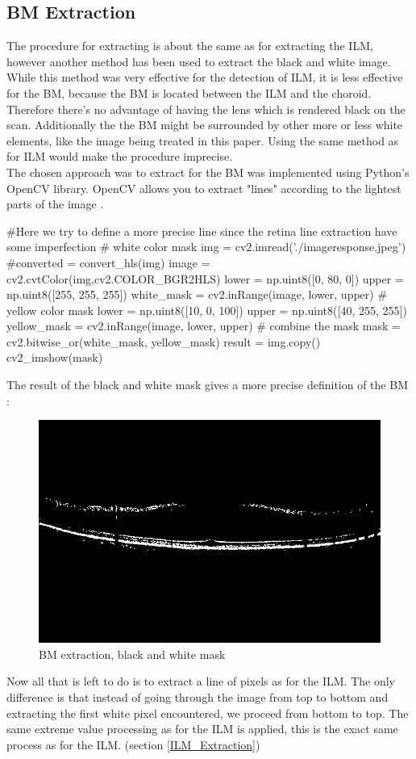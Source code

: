 \documentclass[12pt,a4paper]{scrartcl}
\begin{document}
\subsection{BM Extraction}
The procedure for extracting is about the same as for extracting the ILM, however another method has been used to extract the black and white image. While this method was very effective for the detection of ILM, it is less effective for the BM, because the BM is located between the ILM and the choroid. Therefore there's no advantage of having the lens which is rendered black on the scan. Additionally the the BM might be surrounded by other more or less white elements, like the image being treated in this paper. Using the same method as for ILM would make the procedure imprecise.\\
The chosen approach was to extract for the BM was implemented using Python's OpenCV library. OpenCV allows you to extract "lines" according to the lightest parts of the image \cite{stackoverflow:SHEN} \cite{python:opencv}.

\begin{python}
#Here we try to define a more precise line since the retina line extraction have some imperfection
# white color mask
img = cv2.imread('./imageresponse.jpeg')
#converted = convert_hls(img)
image = cv2.cvtColor(img,cv2.COLOR_BGR2HLS)
lower = np.uint8([0, 80, 0])
upper = np.uint8([255, 255, 255])
white_mask = cv2.inRange(image, lower, upper)
# yellow color mask
lower = np.uint8([10, 0,   100])
upper = np.uint8([40, 255, 255])
yellow_mask = cv2.inRange(image, lower, upper)
# combine the mask
mask = cv2.bitwise_or(white_mask, yellow_mask)
result = img.copy()
cv2_imshow(mask)
\end{python}

The result of the black and white mask gives a more precise definition of the BM :
\begin{figure}[H]
    \centering
    \includegraphics[width=1\textwidth]{./images/Grey_BM.png}
    \caption{BM extraction, black and white mask}
    \label{fig:BM-black_withe}
\end{figure}
Now all that is left to do is to extract a line of pixels as for the ILM. The only difference is that instead of going through the image from top to bottom and extracting the first white pixel encountered, we proceed from bottom to top. The same extreme value processing as for the ILM is applied, this is the exact same process as for the ILM. (section \ref{ILM_Extraction})
\end{document}
